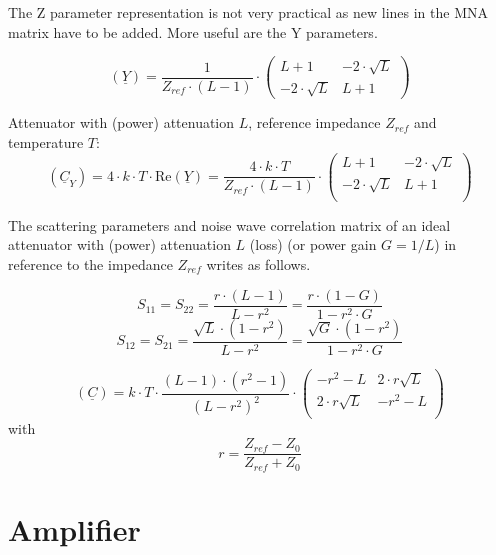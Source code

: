 The Z parameter representation is not very practical as new lines
in the MNA matrix have to be added. More useful are the Y parameters.

\begin{equation}
(\underline{Y}) =
\frac{1}{Z_{ref}\cdot (L-1)}\cdot
\begin{pmatrix}
 L+1            & -2\cdot\sqrt{L} \\
-2\cdot\sqrt{L} & L+1
\end{pmatrix}
\end{equation}

Attenuator with (power) attenuation $L$, reference impedance $Z_{ref}$
and temperature $T$:
\begin{equation}
(\underline{C}_Y) = 4\cdot k\cdot T\cdot \textrm{Re}\left(\underline{Y}\right)
 = \frac{4\cdot k\cdot T}{Z_{ref}\cdot (L-1)} \cdot
\begin{pmatrix}
 L+1            & -2\cdot\sqrt{L} \\
-2\cdot\sqrt{L} &  L+1 \\
\end{pmatrix}
\end{equation}

The scattering parameters and noise wave correlation matrix of an
ideal attenuator with (power) attenuation $L$ (loss) (or power gain
$G=1/L$) in reference to the impedance $Z_{ref}$ writes as follows.

\begin{equation}
S_{11} = S_{22} = \frac{r\cdot(L-1)}{L-r^2} = \frac{r\cdot(1-G)}{1-r^2\cdot G}
\end{equation}
\begin{equation}
S_{12} = S_{21} = \frac{\sqrt{L}\cdot(1-r^2)}{L-r^2} = \frac{\sqrt{G}\cdot(1-r^2)}{1-r^2\cdot G}
\end{equation}

\begin{equation}
(\underline{C}) = k\cdot T\cdot\frac{(L-1)\cdot(r^2-1)}{(L-r^2)^2}\cdot
\begin{pmatrix}
  -r^2-L           & 2\cdot r\sqrt{L}\\
  2\cdot r\sqrt{L} & -r^2-L\\
\end{pmatrix}
\end{equation}
with
\begin{equation}
r=\frac{Z_{ref}-Z_0}{Z_{ref}+Z_0}
\end{equation}


\section{Amplifier}

